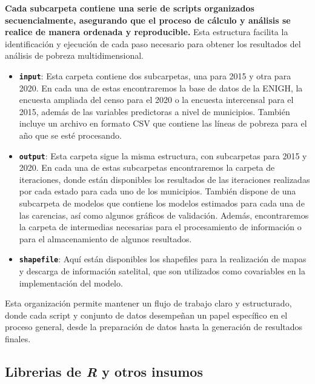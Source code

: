 \documentclass[
  12pt,
]{book}
\begin{document}
\textbf{Cada subcarpeta contiene una serie de scripts organizados secuencialmente, asegurando que el proceso de cálculo y análisis se realice de manera ordenada y reproducible.} Esta estructura facilita la identificación y ejecución de cada paso necesario para obtener los resultados del análisis de pobreza multidimensional.

\begin{itemize}
\item
  \textbf{\texttt{input}}: Esta carpeta contiene dos subcarpetas, una para 2015 y otra para 2020. En cada una de estas encontraremos la base de datos de la ENIGH, la encuesta ampliada del censo para el 2020 o la encuesta intercensal para el 2015, además de las variables predictoras a nivel de municipios. También incluye un archivo en formato CSV que contiene las líneas de pobreza para el año que se esté procesando.
\item
  \textbf{\texttt{output}}: Esta carpeta sigue la misma estructura, con subcarpetas para 2015 y 2020. En cada una de estas subcarpetas encontraremos la carpeta de iteraciones, donde están disponibles los resultados de las iteraciones realizadas por cada estado para cada uno de los municipios. También dispone de una subcarpeta de modelos que contiene los modelos estimados para cada una de las carencias, así como algunos gráficos de validación. Además, encontraremos la carpeta de intermedias necesarias para el procesamiento de información o para el almacenamiento de algunos resultados.
\item
  \textbf{\texttt{shapefile}}: Aquí están disponibles los shapefiles para la realización de mapas y descarga de información satelital, que son utilizados como covariables en la implementación del modelo.
\end{itemize}

Esta organización permite mantener un flujo de trabajo claro y estructurado, donde cada script y conjunto de datos desempeñan un papel específico en el proceso general, desde la preparación de datos hasta la generación de resultados finales.

\hypertarget{librerias-de-r-y-otros-insumos}{%
\subsection*{\texorpdfstring{Librerias de \emph{R} y otros insumos}{Librerias de R y otros insumos}}\label{librerias-de-r-y-otros-insumos}}
\end{document}
